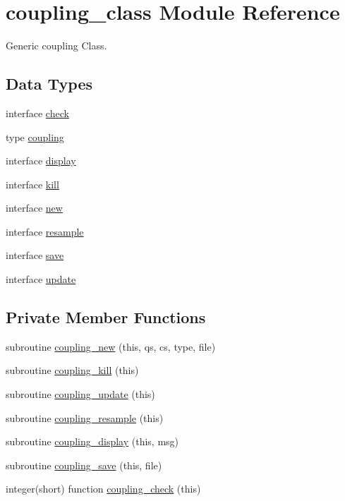 \hypertarget{classcoupling__class}{\section{coupling\-\_\-class Module Reference}
\label{classcoupling__class}
}


Generic coupling Class.  


\subsection*{Data Types}
\begin{DoxyCompactItemize}
\item 
interface \hyperlink{interfacecoupling__class_1_1check}{check}
\item 
type \hyperlink{structcoupling__class_1_1coupling}{coupling}
\item 
interface \hyperlink{interfacecoupling__class_1_1display}{display}
\item 
interface \hyperlink{interfacecoupling__class_1_1kill}{kill}
\item 
interface \hyperlink{interfacecoupling__class_1_1new}{new}
\item 
interface \hyperlink{interfacecoupling__class_1_1resample}{resample}
\item 
interface \hyperlink{interfacecoupling__class_1_1save}{save}
\item 
interface \hyperlink{interfacecoupling__class_1_1update}{update}
\end{DoxyCompactItemize}
\subsection*{Private Member Functions}
\begin{DoxyCompactItemize}
\item 
subroutine \hyperlink{classcoupling__class_a5fa07e475bf96111bc76820037fc26a4}{coupling\-\_\-new} (this, qs, cs, type, file)
\item 
subroutine \hyperlink{classcoupling__class_a774339d5b87453601c0664a199df7823}{coupling\-\_\-kill} (this)
\item 
subroutine \hyperlink{classcoupling__class_a034f9e137631afdb03a75cc32bf1956d}{coupling\-\_\-update} (this)
\item 
subroutine \hyperlink{classcoupling__class_ad26da11333ea64f68c25250a35287a51}{coupling\-\_\-resample} (this)
\item 
subroutine \hyperlink{classcoupling__class_a543d9a76307b2c60048d8f390fb40859}{coupling\-\_\-display} (this, msg)
\item 
subroutine \hyperlink{classcoupling__class_af46ffcc2d49425d21e248f173b5377bd}{coupling\-\_\-save} (this, file)
\item 
integer(short) function \hyperlink{classcoupling__class_a41b687a0ad543c445aa29923c229e39d}{coupling\-\_\-check} (this)
\end{DoxyCompactItemize}


